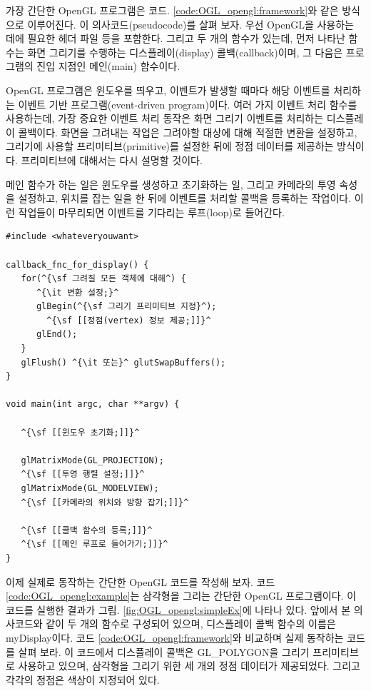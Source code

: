 가장 간단한 OpenGL 프로그램은 코드. \ref{code:OGL_opengl:framework}와 같은 방식으로 이루어진다.
이 의사코드(pseudocode)를 살펴 보자. 우선 OpenGL을 사용하는 데에 필요한 헤더 파일 등을 포함한다.
그리고 두 개의 함수가 있는데, 먼저 나타난 함수는 화면 그리기를 수행하는 디스플레이(display) 콜백(callback)이며,
그 다음은 프로그램의 진입 지점인 메인(main) 함수이다.

OpenGL 프로그램은 윈도우를 띄우고, 이벤트가 발생할 때마다 해당 이벤트를 처리하는
이벤트 기반 프로그램(event-driven program)이다.
여러 가지 이벤트 처리 함수를 사용하는데, 가장 중요한 이벤트 처리 동작은 화면 그리기 이벤트를 처리하는
디스플레이 콜백이다. 
화면을 그려내는 작업은 그려야할 대상에 대해 적절한 변환을 설정하고, 
그리기에 사용할 프리미티브(primitive)를 설정한 뒤에 정점 데이터를 제공하는 방식이다.
프리미티브에 대해서는 다시 설명할 것이다.

메인 함수가 하는 일은 윈도우를 생성하고 초기화하는 일,
그리고 카메라의 투영 속성을 설정하고, 위치를 잡는 일을 한 뒤에
이벤트를 처리할 콜백을 등록하는 작업이다.
이런 작업들이 마무리되면 이벤트를 기다리는 루프(loop)로 들어간다.

\begin{algorithmbis}\label{code:OGL_opengl:framework}
\lstset{language=C++, , escapechar=^} 
\begin{lstlisting}
#include <whateveryouwant> 

callback_fnc_for_display() {
   for(^{\sf 그려질 모든 객체에 대해^) {
      ^{\it 변환 설정;}^
      glBegin(^{\sf 그리기 프리미티브 지정}^);
      	^{\sf [[정점(vertex) 정보 제공;]]}^
      glEnd(); 
   }
   glFlush() ^{\it 또는}^ glutSwapBuffers();
}

void main(int argc, char **argv) {

   ^{\sf [[윈도우 초기화;]]}^

   glMatrixMode(GL_PROJECTION); 
   ^{\sf [[투영 행렬 설정;]]}^
   glMatrixMode(GL_MODELVIEW); 
   ^{\sf [[카메라의 위치와 방향 잡기;]]}^

   ^{\sf [[콜백 함수의 등록;]]}^
   ^{\sf [[메인 루프로 들어가기;]]}^
}
\end{lstlisting}
\end{algorithmbis}


이제 실제로 동작하는 간단한 OpenGL 코드를 작성해 보자.
코드 \ref{code:OGL_opengl:example}는 삼각형을 그리는 간단한 OpenGL 프로그램이다. 
이 코드를 실행한 결과가 그림. \ref{fig:OGL_opengl:simpleEx}에 나타나 있다.
앞에서 본 의사코드와 같이 두 개의 함수로 구성되어 있으며,
디스플레이 콜백 함수의 이름은 {\sf myDisplay}이다.
코드 \ref{code:OGL_opengl:framework}와 비교하며 실제 동작하는 코드를 살펴 보라.
이 코드에서 디스플레이 콜백은 {\sf GL\_POLYGON}을 그리기 프리미티브로 사용하고 있으며,
삼각형을 그리기 위한 세 개의 정점 데이터가 제공되었다. 그리고 각각의 정점은 색상이 지정되어 있다.

